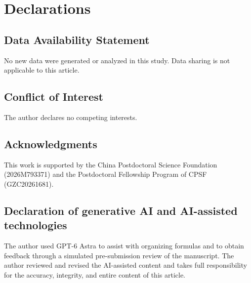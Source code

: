 \documentclass[12pt]{article}
\numberwithin{equation}{section}
\theoremstyle{definition}
\theoremstyle{remark}
\begin{document}
\section*{Declarations}
\subsection*{Data Availability Statement} 
No new data were generated or analyzed in this study. Data sharing is not applicable to this article.

\subsection*{Conflict of Interest} 
The author declares no competing interests.

\subsection*{Acknowledgments}
This work is supported by the China Postdoctoral Science Foundation (2026M793371) and the Postdoctoral Fellowship Program of CPSF (GZC20261681).

\subsection*{Declaration of generative AI and AI-assisted technologies}
The author used GPT-6 Astra to assist with organizing formulas and to obtain feedback through a simulated pre-submission review of the manuscript. The author reviewed and revised the AI-assisted content and takes full responsibility for the accuracy, integrity, and entire content of this article.
\end{document}

